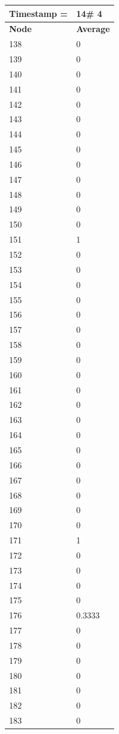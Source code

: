 \begin{tabular}{|l||l|}
\hline
\textbf{Timestamp =} & \textbf{14}\# 4\\\hline
	\textbf{Node} & \textbf{Average} \\ \hline
\hline
	138 & 0 \\ \hline
	139 & 0 \\ \hline
	140 & 0 \\ \hline
	141 & 0 \\ \hline
	142 & 0 \\ \hline
	143 & 0 \\ \hline
	144 & 0 \\ \hline
	145 & 0 \\ \hline
	146 & 0 \\ \hline
	147 & 0 \\ \hline
	148 & 0 \\ \hline
	149 & 0 \\ \hline
	150 & 0 \\ \hline
	151 & 1 \\ \hline
	152 & 0 \\ \hline
	153 & 0 \\ \hline
	154 & 0 \\ \hline
	155 & 0 \\ \hline
	156 & 0 \\ \hline
	157 & 0 \\ \hline
	158 & 0 \\ \hline
	159 & 0 \\ \hline
	160 & 0 \\ \hline
	161 & 0 \\ \hline
	162 & 0 \\ \hline
	163 & 0 \\ \hline
	164 & 0 \\ \hline
	165 & 0 \\ \hline
	166 & 0 \\ \hline
	167 & 0 \\ \hline
	168 & 0 \\ \hline
	169 & 0 \\ \hline
	170 & 0 \\ \hline
	171 & 1 \\ \hline
	172 & 0 \\ \hline
	173 & 0 \\ \hline
	174 & 0 \\ \hline
	175 & 0 \\ \hline
	176 & 0.3333 \\ \hline
	177 & 0 \\ \hline
	178 & 0 \\ \hline
	179 & 0 \\ \hline
	180 & 0 \\ \hline
	181 & 0 \\ \hline
	182 & 0 \\ \hline
	183 & 0 \\ \hline
\end{tabular}

